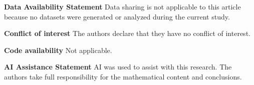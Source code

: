 \documentclass[11pt]{article}
\begin{document}

\textbf{Data Availability Statement}
Data sharing is not applicable to this article because no datasets were generated or analyzed during the current study.


\textbf{Conflict of interest} The authors declare that they have no conflict of interest.

\textbf{Code availability}
Not applicable.

\textbf{AI Assistance Statement}
AI was used to assist with this research. The authors take full responsibility for the
mathematical content and conclusions.



\begingroup
\makeatletter
\renewcommand{\@openbib@code}{%
  \setlength{\itemsep}{2pt}%
  \setlength{\parsep}{0pt}%
}
\makeatother
\providecommand{\bysame}{\leavevmode\hbox to3em{\hrulefill}\thinspace}
\providecommand{\MR}{\relax\ifhmode\unskip\space\fi MR }
\providecommand{\MRhref}[2]{%
  \href{http://www.ams.org/mathscinet-getitem?mr=#1}{#2}
}
\providecommand{\href}[2]{#2}
\end{document}
